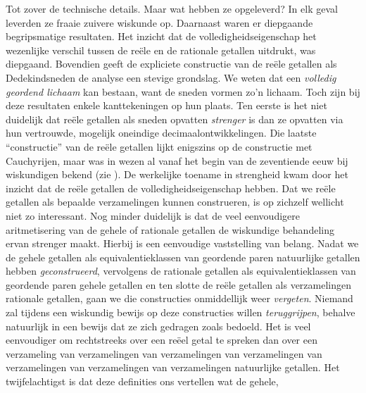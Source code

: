 \documentclass[../../../include/open-logic-section]{subfiles}
\begin{document}
Tot zover de technische details. Maar wat hebben ze opgeleverd?
In elk geval leverden ze {fraaie} zuivere wiskunde op. Daarnaast waren
er diepgaande begripsmatige resultaten. Het inzicht dat de
volledigheidseigenschap het wezenlijke verschil tussen de reële en de
rationale getallen uitdrukt, was diepgaand. Bovendien geeft de
expliciete constructie van de reële getallen als Dedekindsneden de
analyse een stevige grondslag. We weten dat een \emph{volledig
geordend lichaam} kan bestaan, want de sneden vormen zo'n lichaam.
Toch zijn bij deze resultaten enkele kanttekeningen op hun plaats.
Ten eerste is het niet duidelijk dat reële getallen als sneden
opvatten \emph{strenger} is dan ze opvatten via hun vertrouwde,
mogelijk oneindige decimaalontwikkelingen. Die laatste ``constructie''
van de reële getallen lijkt enigszins op de constructie met
Cauchyrijen, maar was in wezen al vanaf het begin van de zeventiende
eeuw bij wiskundigen bekend (zie ). De werkelijke
toename in strengheid kwam door het inzicht dat de reële getallen de
volledigheidseigenschap hebben. Dat we reële getallen als bepaalde
verzamelingen kunnen construeren, is op zichzelf wellicht niet zo
interessant.
Nog minder duidelijk is dat de veel eenvoudigere aritmetisering van de
gehele of rationale getallen de wiskundige behandeling ervan strenger maakt.
Hierbij is een eenvoudige vaststelling van belang. Nadat we de gehele
getallen als equivalentieklassen van geordende paren natuurlijke
getallen hebben \emph{geconstrueerd}, vervolgens de rationale getallen
als equivalentieklassen van geordende paren gehele getallen en ten
slotte de reële getallen als verzamelingen rationale getallen, gaan we
die constructies onmiddellijk weer \emph{vergeten}. Niemand zal tijdens
een wiskundig bewijs op deze constructies willen \emph{teruggrijpen},
behalve natuurlijk in een bewijs dat ze zich gedragen zoals bedoeld.
Het is veel eenvoudiger om rechtstreeks over een reëel getal te
spreken dan over een verzameling van verzamelingen van verzamelingen
van verzamelingen van verzamelingen van verzamelingen van verzamelingen
natuurlijke getallen.
%
%
%
Het twijfelachtigst is dat deze definities ons vertellen wat de gehele,
\end{document}
